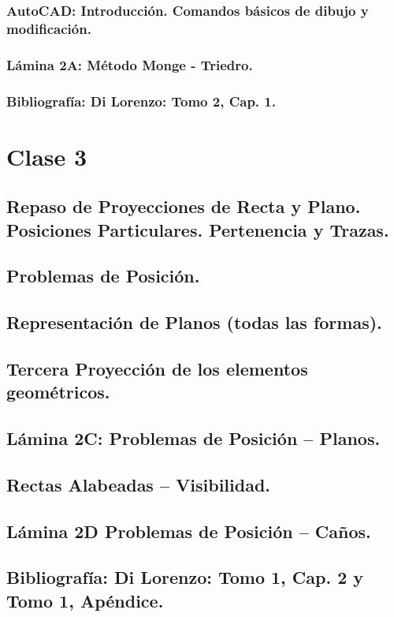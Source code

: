 \documentclass[12pt]{book}
\begin{document}
\subsection{AutoCAD: Introducción. Comandos básicos de dibujo y modificación.}
\subsection{Lámina 2A: Método Monge - Triedro.}
\subsection{Bibliografía: Di Lorenzo: Tomo 2, Cap. 1.}

\chapter{Clase 3}
\section{Repaso de Proyecciones de Recta y Plano. Posiciones Particulares. Pertenencia y Trazas.}
\section{Problemas de Posición.}
\section{Representación de Planos (todas las formas).}
\section{Tercera Proyección de los elementos geométricos.}
\section{Lámina 2C: Problemas de Posición – Planos.}
\section{Rectas Alabeadas – Visibilidad.}
\section{Lámina 2D Problemas de Posición – Caños.}
\section{Bibliografía: Di Lorenzo: Tomo 1, Cap. 2 y Tomo 1, Apéndice.}
\end{document}

